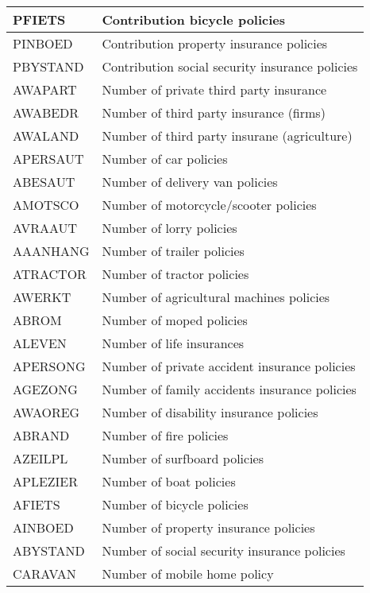 \documentclass[man]{apa6}
\begin{document}
\begin{longtable}{l|l}
\hline
PFIETS & Contribution bicycle policies\\
\hline
PINBOED & Contribution property insurance policies\\
\hline
PBYSTAND & Contribution social security insurance policies\\
\hline
AWAPART & Number of private third party insurance\\
\hline
AWABEDR & Number of third party insurance (firms)\\
\hline
AWALAND & Number of third party insurane (agriculture)\\
\hline
APERSAUT & Number of car policies\\
\hline
ABESAUT & Number of delivery van policies\\
\hline
AMOTSCO & Number of motorcycle/scooter policies\\
\hline
AVRAAUT & Number of lorry policies\\
\hline
AAANHANG & Number of trailer policies\\
\hline
ATRACTOR & Number of tractor policies\\
\hline
AWERKT & Number of agricultural machines policies\\
\hline
ABROM & Number of moped policies\\
\hline
ALEVEN & Number of life insurances\\
\hline
APERSONG & Number of private accident insurance policies\\
\hline
AGEZONG & Number of family accidents insurance policies\\
\hline
AWAOREG & Number of disability insurance policies\\
\hline
ABRAND & Number of fire policies\\
\hline
AZEILPL & Number of surfboard policies\\
\hline
APLEZIER & Number of boat policies\\
\hline
AFIETS & Number of bicycle policies\\
\hline
AINBOED & Number of property insurance policies\\
\hline
ABYSTAND & Number of social security insurance policies\\
\hline
CARAVAN & Number of mobile home policy\\
\hline
\end{longtable}
\end{document}
